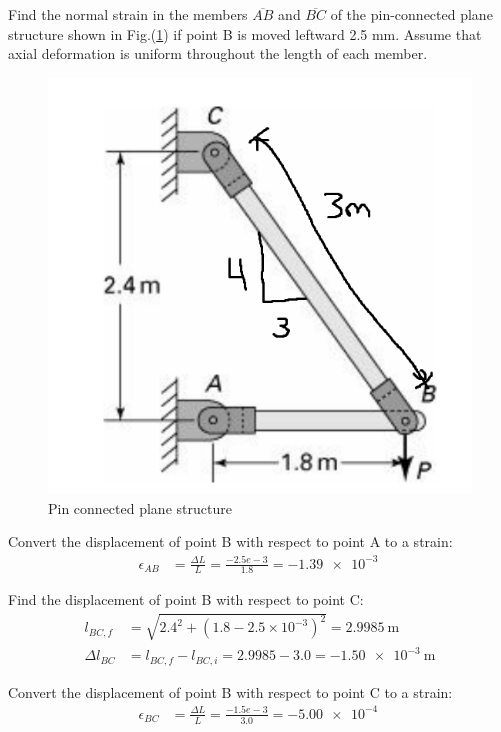 \section{}
Find the normal strain in the members $\overline{AB}$ and $\overline{BC}$ of the pin-connected plane structure shown in
Fig.(\ref{fig:q6problem}) if point B is moved leftward 2.5 mm. Assume that axial deformation is uniform throughout
the length of each member.


\begin{figure}[h]
    \centering
    \includegraphics[width=0.3\linewidth]{Questions/Figures/Q6ProblemDiagram.png}
    \caption{Pin connected plane structure}
    \label{fig:q6problem}
\end{figure}

Convert the displacement of point B with respect to point A to a strain:
\begin{align*}
    \epsilon_{AB} &= \frac{\Delta L}{L} = \frac{-2.5 e-3}{1.8} = \boxed{\qty{-1.39e-3}{}}
\end{align*}

Find the displacement of point B with respect to point C:
\begin{align*}
    l_{BC, f} &= \sqrt{2.4^2 + (1.8 - 2.5\times 10^{-3})^2} = \qty{2.9985}{\meter} \\
    \Delta l_{BC} &= l_{BC, f} - l_{BC, i} = 2.9985 - 3.0 = \qty{-1.50 e-3}{\meter}
\end{align*}

Convert the displacement of point B with respect to point C to a strain:
\begin{align*}
    \epsilon_{BC} &= \frac{\Delta L}{L} = \frac{-1.5 e-3}{3.0} = \boxed{\qty{-5.00e-4}{}}
\end{align*}

